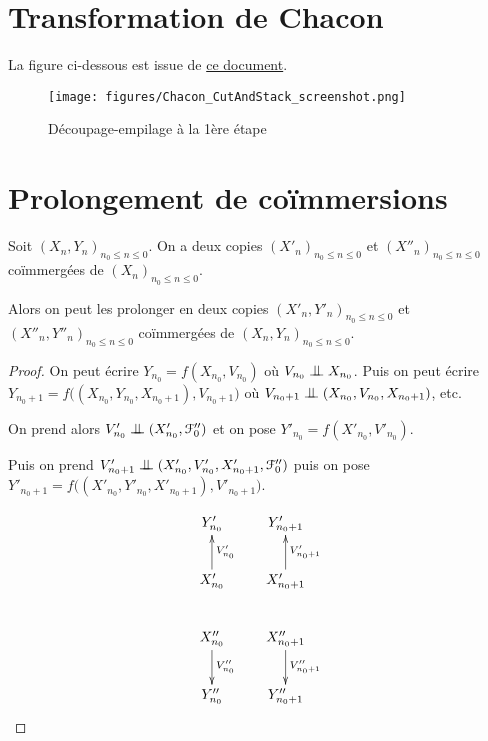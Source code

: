 \documentclass[12pt,a4paper]{article}
\begin{document}
\newpage 
\begin{appendices}

\section{Transformation de Chacon}\label{app:transfoChacon}

La figure ci-dessous est issue de \href{https://cdr.lib.unc.edu/indexablecontent/uuid:bfc41b0c-b048-440f-9a57-533e02ea4f76}{ce document}.  

\begin{figure}[!h]
\texttt{[image: figures/Chacon\_CutAndStack\_screenshot.png]} 
\caption{Découpage-empilage à la 1ère étape}
\end{figure}

\section{Prolongement de co\"immersions}

\begin{lemme}\label{lemme:coimmersion}
Soit ${(X_n, Y_n)}_{n_0 \leq n \leq 0}$. 
On a deux copies ${(X'_n)}_{n_0 \leq n \leq 0}$ et ${(X''_n)}_{n_0 \leq n \leq 0}$ 
coïmmergées de ${(X_n)}_{n_0 \leq n \leq 0}$. 

Alors on peut les prolonger en deux copies  ${(X'_n, Y'_n)}_{n_0 \leq n \leq 0}$ et 
${(X''_n, Y''_n)}_{n_0 \leq n \leq 0}$ 
coïmmergées de ${(X_n, Y_n)}_{n_0 \leq n \leq 0}$. 
\end{lemme}

\begin{proof}
On peut écrire $Y_{n_0} = f(X_{n_0}, V_{n_0})$ où $V_{n_0} \indep X_{n_0}$. 
Puis on peut écrire $Y_{n_0+1} = f\bigl((X_{n_0}, Y_{n_0}, X_{n_0+1}), V_{n_0+1}\bigr)$ où 
$V_{n_0+1} \indep (X_{n_0}, V_{n_0}, X_{n_0+1})$, etc. 

On prend alors $V'_{n_0} \indep (X'_{n_0}, \FF''_0)$ et on pose 
 $Y'_{n_0} = f(X'_{n_0}, V'_{n_0})$. 
 
 Puis on prend $V'_{n_0+1} \indep (X'_{n_0}, V'_{n_0}, X'_{n_0+1}, \FF''_0)$ 
 puis on pose $Y'_{n_0+1} = f\bigl((X'_{n_0}, Y'_{n_0}, X'_{n_0+1}), V'_{n_0+1}\bigr)$. 


\begin{displaymath}
\xymatrix{
Y'_{n_0} & Y'_{n_0+1} \\
X'_{n_0} \ar[u]_{V'_{n_0}} & X'_{n_0+1} \ar[u]_{V'_{n_0+1}}  \\
X''_{n_0} \ar[d]^{V''_{n_0}} & X''_{n_0+1} \ar[d]^{V''_{n_0+1}} \\
Y''_{n_0} & Y''_{n_0+1}
}
\end{displaymath}

\end{proof}

\end{appendices}
\end{document}
